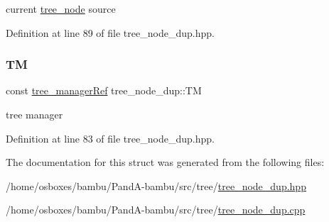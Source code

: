 current \hyperlink{classtree__node}{tree\+\_\+node} source 



Definition at line 89 of file tree\+\_\+node\+\_\+dup.\+hpp.

\mbox{\label{structtree__node__dup_a17f78b4a3bea2bccfbbfab4083a0268c}} 
\subsubsection{\texorpdfstring{TM}{TM}}
{\footnotesize\ttfamily const \hyperlink{tree__manager_8hpp_a96ff150c071ce11a9a7a1e40590f205e}{tree\+\_\+manager\+Ref} tree\+\_\+node\+\_\+dup\+::\+TM\hspace{0.3cm}{\ttfamily [private]}}



tree manager 



Definition at line 83 of file tree\+\_\+node\+\_\+dup.\+hpp.



The documentation for this struct was generated from the following files\+:\begin{DoxyCompactItemize}
\item 
/home/osboxes/bambu/\+Pand\+A-\/bambu/src/tree/\hyperlink{tree__node__dup_8hpp}{tree\+\_\+node\+\_\+dup.\+hpp}\item 
/home/osboxes/bambu/\+Pand\+A-\/bambu/src/tree/\hyperlink{tree__node__dup_8cpp}{tree\+\_\+node\+\_\+dup.\+cpp}\end{DoxyCompactItemize}
